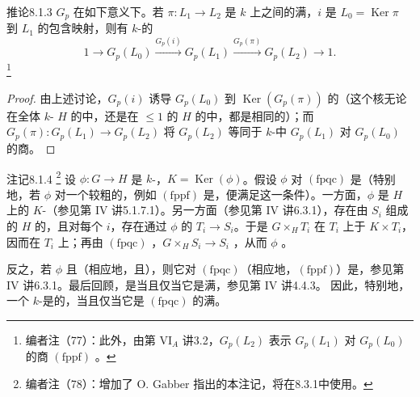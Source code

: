 \begin{SGAresult}{推论}{8.1.3}
 $G_p$ 在如下意义下。若 $\pi:L_1\to L_2$ 是 $k$ 上之间的满，$i$ 是 $L_0=\operatorname{Ker}\pi$ 到 $L_1$ 的包含映射，则有 $k$-的
\[
 1\longrightarrow G_p(L_0)\xrightarrow{G_p(i)}G_p(L_1)
 \xrightarrow{G_p(\pi)}G_p(L_2)\longrightarrow1.
\]
\footnote{编者注（77）：此外，由第 VI$_A$ 讲3.2，$G_p(L_2)$ 表示 $G_p(L_1)$ 对 $G_p(L_0)$ 的商 $(\mathrm{fppf})$ 。}
\end{SGAresult}
\begin{proof}
由上述讨论，$G_p(i)$ 诱导 $G_p(L_0)$ 到 $\operatorname{Ker}(G_p(\pi))$ 的（这个核无论在全体 $k$- $H$ 的中，还是在 $\le1$ 的 $H$ 的中，都是相同的）；而
$G_p(\pi):G_p(L_1)\to G_p(L_2)$ 将 $G_p(L_2)$ 等同于 $k$-中 $G_p(L_1)$ 对 $G_p(L_0)$ 的商。
\end{proof}

\begin{SGAresult}{注记}{8.1.4}
\footnote{编者注（78）：增加了 O. Gabber 指出的本注记，将在8.3.1中使用。}
设 $\phi:G\to H$ 是 $k$-，$K=\operatorname{Ker}(\phi)$。假设 $\phi$ 对 $(\mathrm{fpqc})$ 是（特别地，若 $\phi$ 对一个较粗的，例如 $(\mathrm{fppf})$ 是，便满足这一条件）。一方面，$\phi$ 是 $H$ 上的 $K$-（参见第 IV 讲5.1.7.1）。另一方面（参见第 IV 讲6.3.1），存在由 $S_i$ 组成的 $H$ 的，且对每个 $i$，存在通过 $\phi$ 的 $T_i\to S_i$。于是 $G\times_HT_i$ 在 $T_i$ 上于 $K\times T_i$，因而在 $T_i$ 上；再由 $(\mathrm{fpqc})$ ，$G\times_HS_i\to S_i$ ，从而 $\phi$ 。

反之，若 $\phi$ 且（相应地，且），则它对 $(\mathrm{fpqc})$（相应地，$(\mathrm{fppf})$）是，参见第 IV 讲6.3.1。最后回顾，是当且仅当它是满，参见第 IV 讲4.4.3。
因此，特别地，一个 $k$-是的，当且仅当它是 $(\mathrm{fpqc})$ 的满。
\end{SGAresult}

